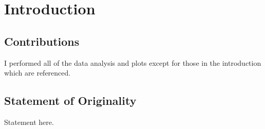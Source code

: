 
\chapter{Introduction}


\section{Contributions}

I performed all of the data analysis and plots except for those in the introduction which are referenced.


\section{Statement of Originality}

Statement here.

